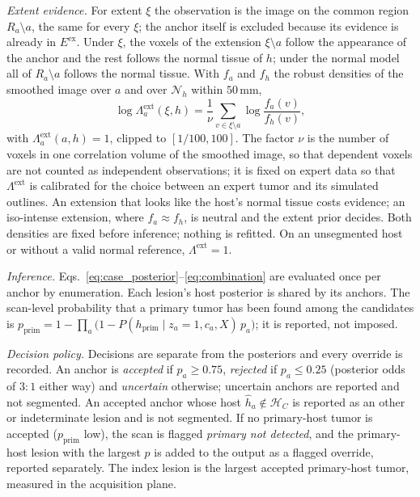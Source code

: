 \documentclass[fleqn,10pt]{olplainarticle}
\begin{document}
\emph{Extent evidence.} For extent $\xi$ the observation is the image on the common region $R_a\setminus a$, the same for
every $\xi$; the anchor itself is excluded because its evidence is already in $E^{\mathrm{ex}}$. Under $\xi$, the voxels of
the extension $\xi\setminus a$ follow the appearance of the anchor and the rest follows the normal tissue of $h$; under the
normal model all of $R_a\setminus a$ follows the normal tissue. With $f_a$ and $f_h$ the robust densities of the smoothed
image over $a$ and over $\mathcal{N}_h$ within $50$\,mm,
\begin{equation}
\label{eq:extent_evidence}
\log\Lambda^{\mathrm{ext}}_a(\xi,h)=\frac{1}{\nu}\sum_{v\in\xi\setminus a}\log\frac{f_a(v)}{f_h(v)},
\end{equation}
with $\Lambda^{\mathrm{ext}}_a(a,h)=1$, clipped to $[1/100,100]$. The factor $\nu$ is the number of voxels in one
correlation volume of the smoothed image, so that dependent voxels are not counted as independent observations; it is
fixed on expert data so that $\Lambda^{\mathrm{ext}}$ is calibrated for the choice between an expert tumor and its
simulated outlines. An extension that looks like the host's normal tissue costs evidence; an iso-intense extension, where
$f_a\approx f_h$, is neutral and the extent prior decides. Both densities are fixed before inference; nothing is refitted.
On an unsegmented host or without a valid normal reference, $\Lambda^{\mathrm{ext}}=1$.

\emph{Inference.} Eqs.~\eqref{eq:case_posterior}--\eqref{eq:combination} are evaluated once per anchor by enumeration.
Each lesion's
host posterior is shared by its anchors. The scan-level probability that a primary tumor has been found among the
candidates is $p_{\mathrm{prim}}=1-\prod_a\bigl(1-P(h_{\mathrm{prim}}\mid z_a=1,c_a,X)\,p_a\bigr)$; it is reported, not
imposed.

\emph{Decision policy.} Decisions are separate from the posteriors and every override is recorded. An anchor is
\emph{accepted} if $p_a\ge0.75$, \emph{rejected} if $p_a\le0.25$ (posterior odds of $3{:}1$ either way) and
\emph{uncertain} otherwise; uncertain anchors are reported and not segmented. An accepted anchor whose host
$\hat h_a\notin\mathcal{H}_C$ is reported as an other or indeterminate lesion and is not segmented. If no primary-host
tumor is accepted ($p_{\mathrm{prim}}$ low), the scan is flagged \emph{primary not detected}, and the primary-host lesion
with the largest $p$ is added to the output as a flagged override, reported separately. The index lesion is the largest
accepted primary-host tumor, measured in the acquisition plane.
\end{document}
